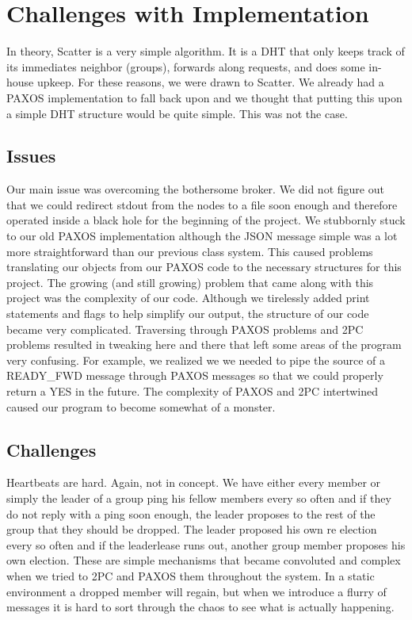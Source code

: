 \documentclass{amsart}
\theoremstyle{definition}
\theoremstyle{remark}
\numberwithin{equation}{section}
\begin{document}
\section{Challenges with Implementation}
In theory, Scatter is a very simple algorithm.  It is a DHT that only keeps track of its immediates neighbor (groups), forwards along requests, and does some in-house upkeep. For these reasons, we were drawn to Scatter.  We already had a PAXOS implementation to fall back upon and we thought that putting this upon a simple DHT structure would be quite simple.  This was not the case.
\subsection{Issues}  
Our main issue was overcoming the bothersome broker.  We did not figure out that we could redirect stdout from the nodes to a file soon enough and therefore operated inside a black hole for the beginning of the project.  We stubbornly stuck to our old PAXOS implementation although the JSON message simple was a lot more straightforward than our previous class system.  This caused problems translating our objects from our PAXOS code to the necessary structures for this project.
The growing (and still growing) problem that came along with this project was the complexity of our code.  Although we tirelessly added print statements and flags to help simplify our output, the structure of our code became very complicated.  Traversing through PAXOS problems and 2PC problems resulted in tweaking here and there that left some areas of the program very confusing.  For example, we realized we we needed to pipe the source of a READY\_FWD message through PAXOS messages so that we could properly return a YES in the future.  The complexity of PAXOS and 2PC intertwined caused our program to become somewhat of a monster.
\subsection{Challenges}
Heartbeats are hard.  Again, not in concept.  We have either every member or simply the leader of a group ping his fellow members every so often and if they do not reply with a ping soon enough, the leader proposes to the rest of the group that they should be dropped.  The leader proposed his own re election every so often and if the leaderlease runs out, another group member proposes his own election.  These are simple mechanisms that became convoluted and complex when we tried to 2PC and PAXOS them throughout the system.  In a static environment a dropped member will regain, but when we introduce a flurry of messages it is hard to sort through the chaos to see what is actually happening.
\end{document}
